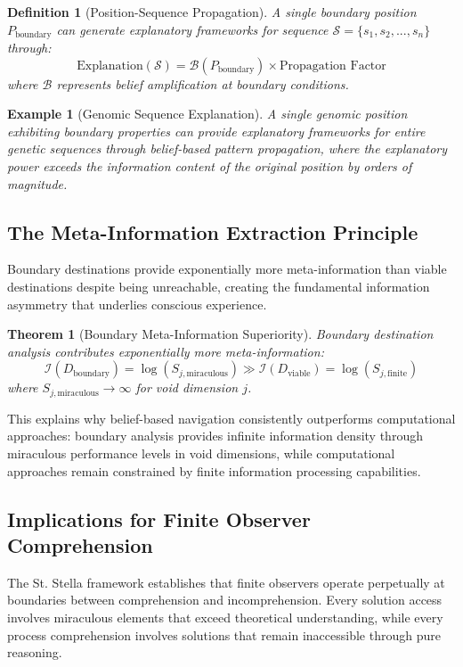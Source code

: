\documentclass[12pt,a4paper]{article}
\newtheorem{theorem}{Theorem}
\newtheorem{definition}{Definition}
\newtheorem{example}{Example}
\begin{document}
\begin{definition}[Position-Sequence Propagation]
A single boundary position $P_{\text{boundary}}$ can generate explanatory frameworks for sequence $\mathcal{S} = \{s_1, s_2, ..., s_n\}$ through:
$$\text{Explanation}(\mathcal{S}) = \mathcal{B}(P_{\text{boundary}}) \times \text{Propagation Factor}$$
where $\mathcal{B}$ represents belief amplification at boundary conditions.
\end{definition}

\begin{example}[Genomic Sequence Explanation]
A single genomic position exhibiting boundary properties can provide explanatory frameworks for entire genetic sequences through belief-based pattern propagation, where the explanatory power exceeds the information content of the original position by orders of magnitude.
\end{example}

\subsection{The Meta-Information Extraction Principle}

Boundary destinations provide exponentially more meta-information than viable destinations despite being unreachable, creating the fundamental information asymmetry that underlies conscious experience.

\begin{theorem}[Boundary Meta-Information Superiority]
Boundary destination analysis contributes exponentially more meta-information:
$$\mathcal{I}(D_{\text{boundary}}) = \log(S_{j,\text{miraculous}}) \gg \mathcal{I}(D_{\text{viable}}) = \log(S_{j,\text{finite}})$$
where $S_{j,\text{miraculous}} \to \infty$ for void dimension $j$.
\end{theorem}

This explains why belief-based navigation consistently outperforms computational approaches: boundary analysis provides infinite information density through miraculous performance levels in void dimensions, while computational approaches remain constrained by finite information processing capabilities.

\subsection{Implications for Finite Observer Comprehension}

The St. Stella framework establishes that finite observers operate perpetually at boundaries between comprehension and incomprehension. Every solution access involves miraculous elements that exceed theoretical understanding, while every process comprehension involves solutions that remain inaccessible through pure reasoning.
\end{document}
